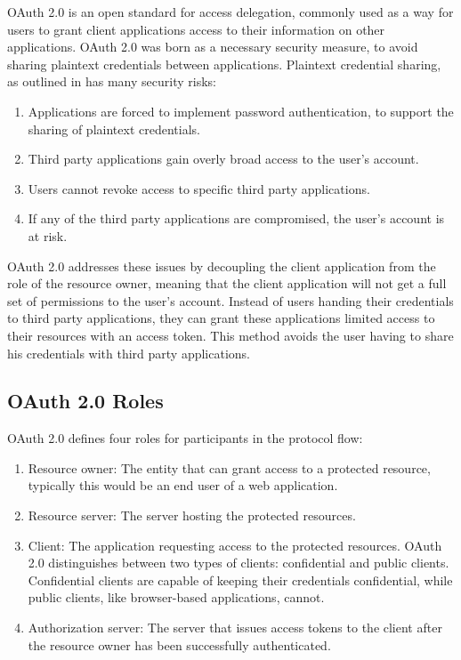 OAuth 2.0 is an open standard for access delegation,
commonly used as a way for users to grant client applications access to their information on other applications.
OAuth 2.0 was born as a necessary security measure, to avoid sharing plaintext credentials between applications.
Plaintext credential sharing, as outlined in \cite{rfcOAuth2} has many security risks:

\begin{enumerate}
	\item Applications are forced to implement password authentication, to support the sharing of plaintext credentials.
	\item Third party applications gain overly broad access to the user's account.
	\item Users cannot revoke access to specific third party applications.
	\item If any of the third party applications are compromised, the user's account is at risk.
\end{enumerate}

OAuth 2.0 addresses these issues by decoupling the client application from the role of the resource owner,
meaning that the client application will not get a full set of permissions to the user's account.
Instead of users handing their credentials to third party applications,
they can grant these applications limited access to their resources with an access token. 
This method avoids the user having to share his credentials with third party applications.

\subsection{OAuth 2.0 Roles}

OAuth 2.0 defines four roles for participants in the protocol flow:

\begin{enumerate}
	\item Resource owner: The entity that can grant access to a protected resource, typically this would be an end user of a web application.
	\item Resource server: The server hosting the protected resources.
	\item Client: The application requesting access to the protected resources.
	      OAuth 2.0 distinguishes between two types of clients: confidential and public clients.
	      Confidential clients are capable of keeping their credentials confidential, while public clients, like browser-based applications, cannot.
	\item Authorization server: The server that issues access tokens to the client after the resource owner has been successfully authenticated.
\end{enumerate}

